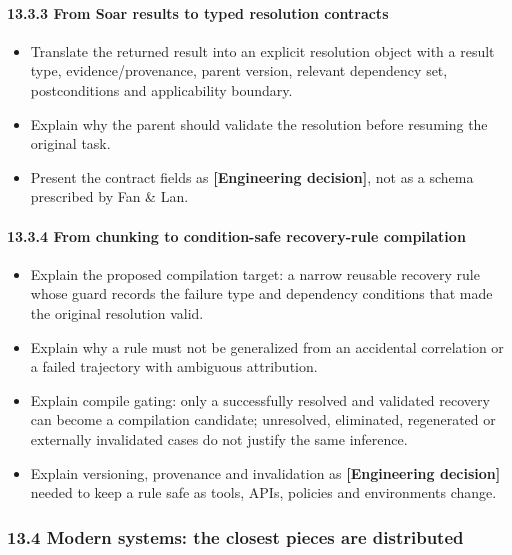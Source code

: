 \paragraph{13.3.3 From Soar results to typed resolution contracts}\label{from-soar-results-to-typed-resolution-contracts}

\begin{itemize}
\tightlist
\item
  Translate the returned result into an explicit resolution object with a result type, evidence/provenance, parent version, relevant dependency set, postconditions and applicability boundary.
\item
  Explain why the parent should validate the resolution before resuming the original task.
\item
  Present the contract fields as \textbf{{[}Engineering decision{]}}, not as a schema prescribed by Fan \& Lan.
\end{itemize}

\paragraph{13.3.4 From chunking to condition-safe recovery-rule compilation}\label{from-chunking-to-condition-safe-recovery-rule-compilation}

\begin{itemize}
\tightlist
\item
  Explain the proposed compilation target: a narrow reusable recovery rule whose guard records the failure type and dependency conditions that made the original resolution valid.
\item
  Explain why a rule must not be generalized from an accidental correlation or a failed trajectory with ambiguous attribution.
\item
  Explain compile gating: only a successfully resolved and validated recovery can become a compilation candidate; unresolved, eliminated, regenerated or externally invalidated cases do not justify the same inference.
\item
  Explain versioning, provenance and invalidation as \textbf{{[}Engineering decision{]}} needed to keep a rule safe as tools, APIs, policies and environments change.
\end{itemize}

\subsubsection{13.4 Modern systems: the closest pieces are distributed}\label{modern-systems-the-closest-pieces-are-distributed}

